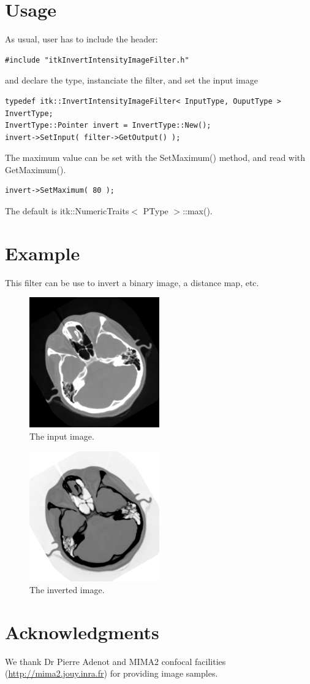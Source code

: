 \documentclass{InsightArticle}
\begin{document}
\section{Usage}
As usual, user has to include the header:
\small \begin{verbatim}
#include "itkInvertIntensityImageFilter.h"
\end{verbatim} \normalsize
and declare the type, instanciate the filter, and set the input image
\small \begin{verbatim}
typedef itk::InvertIntensityImageFilter< InputType, OuputType > InvertType;
InvertType::Pointer invert = InvertType::New();
invert->SetInput( filter->GetOutput() );
\end{verbatim} \normalsize
The maximum value can be set with the SetMaximum() method, and read with GetMaximum().
\small \begin{verbatim}
invert->SetMaximum( 80 );
\end{verbatim} \normalsize
The default is itk::NumericTraits$<$ PType $>$::max().

\section{Example}
This filter can be use to invert a binary image, a distance map, etc.

\begin{figure}[htbp]
\centering
\includegraphics[width=0.5\textwidth]{cthead1}
\caption{The input image.}
\end{figure}

\begin{figure}[htbp]
\centering
\includegraphics[width=0.5\textwidth]{test}
\caption{The inverted image.}
\end{figure}


\section{Acknowledgments}
We thank Dr Pierre Adenot and MIMA2 confocal facilities (\url{http://mima2.jouy.inra.fr})
for providing image samples.



\nocite{ITKSoftwareGuide}
\end{document}
